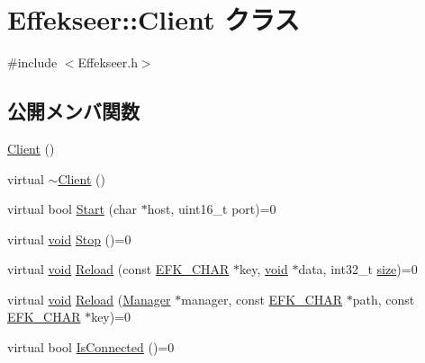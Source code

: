 \hypertarget{class_effekseer_1_1_client}{}\section{Effekseer\+:\+:Client クラス}
\label{class_effekseer_1_1_client}


{\ttfamily \#include $<$Effekseer.\+h$>$}

\subsection*{公開メンバ関数}
\begin{DoxyCompactItemize}
\item 
\mbox{\hyperlink{class_effekseer_1_1_client_a42b5bd5ae18884b4c884f94173c6e1e2}{Client}} ()
\item 
virtual \mbox{\hyperlink{class_effekseer_1_1_client_a77d6c51135b4e3b69b75bff309bb0a85}{$\sim$\+Client}} ()
\item 
virtual bool \mbox{\hyperlink{class_effekseer_1_1_client_a8ccf03136f886a34baeabcfd6d3e5cb4}{Start}} (char $\ast$host, uint16\+\_\+t port)=0
\item 
virtual \mbox{\hyperlink{namespace_effekseer_ab34c4088e512200cf4c2716f168deb56}{void}} \mbox{\hyperlink{class_effekseer_1_1_client_aa490dfe72eeb567e6eff19d9e8b850c1}{Stop}} ()=0
\item 
virtual \mbox{\hyperlink{namespace_effekseer_ab34c4088e512200cf4c2716f168deb56}{void}} \mbox{\hyperlink{class_effekseer_1_1_client_a3c80e7d4534a6697e20fc222df7b4598}{Reload}} (const \mbox{\hyperlink{_effekseer_8h_aca7eb5de6dd019c19ac58ea35a193f2f}{E\+F\+K\+\_\+\+C\+H\+AR}} $\ast$key, \mbox{\hyperlink{namespace_effekseer_ab34c4088e512200cf4c2716f168deb56}{void}} $\ast$data, int32\+\_\+t \mbox{\hyperlink{namespace_effekseer_a73c68f3d33539d30844b9d1e058077f7}{size}})=0
\item 
virtual \mbox{\hyperlink{namespace_effekseer_ab34c4088e512200cf4c2716f168deb56}{void}} \mbox{\hyperlink{class_effekseer_1_1_client_a82cb4bc702a7cb270dd141fec9f62812}{Reload}} (\mbox{\hyperlink{class_effekseer_1_1_manager}{Manager}} $\ast$manager, const \mbox{\hyperlink{_effekseer_8h_aca7eb5de6dd019c19ac58ea35a193f2f}{E\+F\+K\+\_\+\+C\+H\+AR}} $\ast$path, const \mbox{\hyperlink{_effekseer_8h_aca7eb5de6dd019c19ac58ea35a193f2f}{E\+F\+K\+\_\+\+C\+H\+AR}} $\ast$key)=0
\item 
virtual bool \mbox{\hyperlink{class_effekseer_1_1_client_a83c2f00111623d0fe4536a197b7ac9b7}{Is\+Connected}} ()=0
\end{DoxyCompactItemize}
